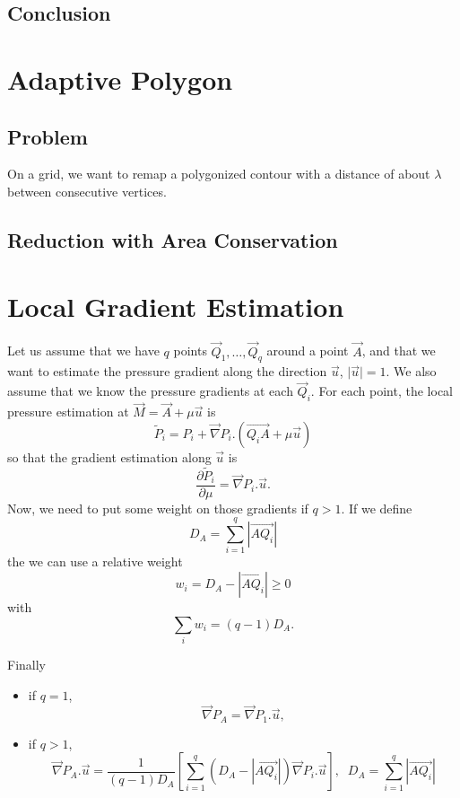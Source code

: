 \documentclass[aps]{revtex4}
\newcommand{\myvec}[1]{\overrightarrow{#1}}
\newcommand{\mygrad}{\vec{\nabla}}
\begin{document}
\subsection{Conclusion}

\section{Adaptive Polygon}

\subsection{Problem}
On a grid, we want to remap a polygonized contour with a distance of about $\lambda$ between consecutive vertices.

\subsection{Reduction with Area Conservation}


\section{Local Gradient Estimation}
Let us assume that we have $q$ points $\vec{Q}_1,\ldots,\vec{Q}_{q}$ around a point $\vec{A}$, and that we want to
estimate the pressure gradient along the direction $\vec{u}$, $\vert\vec{u}\vert=1$. 
We also assume that we know the pressure gradients at each $\vec{Q}_i$.
For each point, the local pressure estimation at $\vec{M} = \vec{A} + \mu \vec{u}$ is
$$
	\tilde{P}_i = P_i + \mygrad P_i . \left(\myvec{Q_iA} +\mu \vec{u}\right)
$$
so that the gradient estimation along $\vec{u}$ is
$$
	\dfrac{\partial \tilde{P}_i}{\partial \mu} = \mygrad P_i.\vec{u}.
$$
Now, we need to put some weight on those gradients if $q>1$.
If we define
$$
	D_A =  \sum_{i=1}^q \left\vert \myvec{AQ_i}\right\vert
$$
the we can use a relative weight
$$
	w_i = D_A - \left\vert \myvec{AQ_i}\right\vert \geq 0
$$
with
$$
	\sum_i w_i = (q-1) D_A.
$$

Finally
\begin{itemize}
\item if $q=1$,
	$$
		\mygrad P_A = \mygrad P_1.\vec{u},
	$$
\item if $q>1$,
$$
	\mygrad P_A.\vec{u} = \dfrac{1}{\left(q-1\right)D_A} \left\lbrack \sum_{i=1}^q \left(D_A - \left\vert \myvec{AQ_i}\right\vert\right) \mygrad P_i.\vec{u} \right\rbrack, \;\; D_A =  \sum_{i=1}^q \left\vert \myvec{AQ_i}\right\vert
$$
\end{itemize}
\end{document}
